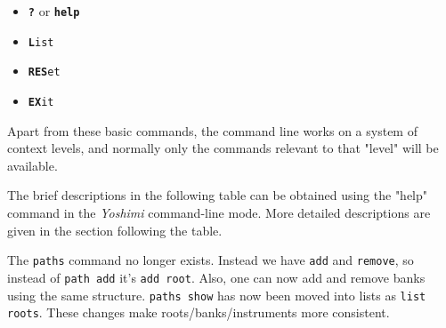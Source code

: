    \begin{itemize}
      \item \texttt{\textbf{?}} or \texttt{\textbf{help}}
      \item \texttt{\textbf{L}ist}
      \item \texttt{\textbf{RES}et}
      \item \texttt{\textbf{EX}it}
   \end{itemize}

   Apart from these basic commands, the command line works on a system of
   context levels, and normally only the commands relevant to that "level"
   will be available.

   The brief descriptions in the following table can be obtained using the
   "help" command in the \textsl{Yoshimi} command-line mode.  More detailed
   descriptions are given in the section following the table.

   The \texttt{paths} command no longer exists. Instead we have \texttt{add}
   and \texttt{remove}, so instead of \texttt{path add} it's \texttt{add root}.
   Also, one can now add and remove banks using the same structure.
   \texttt{paths show} has now been moved into lists as \texttt{list roots}.
   These changes make roots/banks/instruments more consistent.

